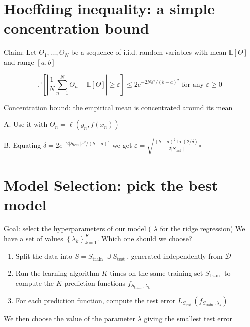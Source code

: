 \documentclass[10pt]{article}
\begin{document}
\section*{Hoeffding inequality: a simple concentration bound}
Claim: Let $\Theta_{1}, \ldots, \Theta_{N}$ be a sequence of i.i.d. random variables with mean $\mathbb{E}[\Theta]$ and range $[a, b]$

$$
\mathbb{P}\left[\left|\frac{1}{N} \sum_{n=1}^{N} \Theta_{n}-\mathbb{E}[\Theta]\right| \geq \varepsilon\right] \leq 2 e^{-2 N \varepsilon^{2} /(b-a)^{2}} \text { for any } \varepsilon \geq 0
$$

Concentration bound: the empirical mean is concentrated around its mean

A. Use it with $\Theta_{n}=\ell\left(y_{n}, f\left(x_{n}\right)\right)$

B. Equating $\delta=2 e^{-2\left|S_{\text {test }}\right| \varepsilon^{2} /(b-a)^{2}}$ we get $\varepsilon=\sqrt{\frac{(b-a)^{2} \ln (2 / \delta)}{2\left|S_{\text {test }}\right|}} \square$

\section*{Model Selection: pick the best model}
Goal: select the hyperparameters of our model ( $\lambda$ for the ridge regression) We have a set of values $\left\{\lambda_{k}\right\}_{k=1}^{K}$. Which one should we choose?

\begin{enumerate}
  \item Split the data into $S=S_{\text {train }} \cup S_{\text {test }}$, generated independently from $\mathscr{D}$

  \item Run the learning algorithm $K$ times on the same training set $S_{\text {train }}$ to compute the $K$ prediction functions $f_{S_{\text {train }}, \lambda_{k}}$

  \item For each prediction function, compute the test error $L_{S_{\text {test }}}\left(f_{S_{\text {train }}, \lambda_{k}}\right)$

\end{enumerate}

We then choose the value of the parameter $\lambda$ giving the smallest test error
\end{document}
